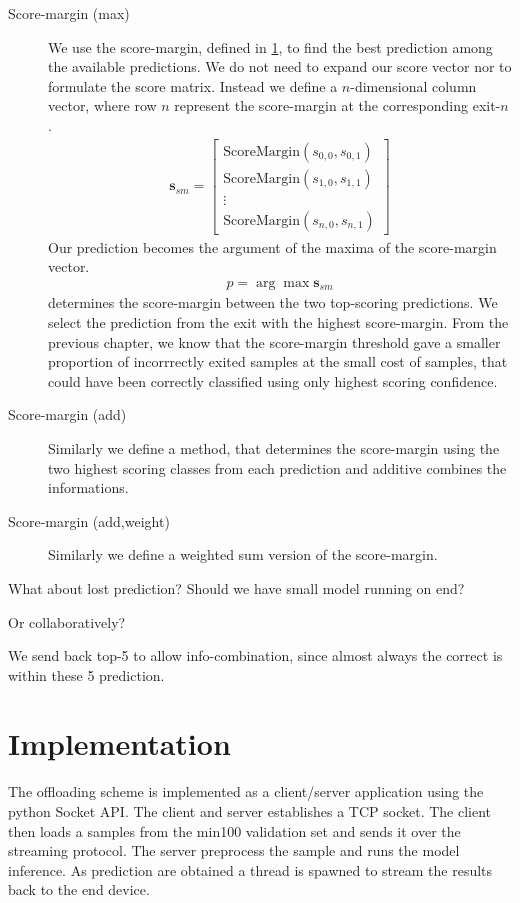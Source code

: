 \begin{description}
	\item[Score-margin (max)] We use the score-margin, defined in \ref{}, to find the best prediction among the available predictions. We do not need to expand our score vector nor to formulate the score matrix. Instead we define a $n$-dimensional column vector, where row $n$ represent the score-margin at the corresponding exit-$n$.  
	\begin{align*}
	\mathbf{s}_{sm} = \begin{bmatrix}
	\mathrm{ScoreMargin}(s_{0,0}, s_{0,1}) \\
	\mathrm{ScoreMargin}(s_{1,0}, s_{1,1}) \\
	\vdots \\
	\mathrm{ScoreMargin}(s_{n,0}, s_{n,1})
	\end{bmatrix}
	\end{align*}
	Our prediction becomes the argument of the maxima of the score-margin vector.
	\begin{align*}
	p = \arg \max \mathbf{s}_{sm}
	\end{align*}
	determines the score-margin between the two top-scoring predictions. We select the prediction from the exit with the highest score-margin. From the previous chapter, we know that the score-margin threshold gave a smaller proportion of incorrrectly exited samples at the small cost of samples, that could have been correctly classified using only highest scoring confidence.	
	\item[Score-margin (add)] Similarly we define a method, that determines the score-margin using the two highest scoring classes from each prediction and additive combines the informations.
	
	\item[Score-margin (add,weight)] Similarly we define a weighted sum version of the score-margin. 
\end{description}


What about lost prediction? Should we have small model running on end?

Or collaboratively?

We send back top-5 to allow info-combination, since almost always the correct is within these 5 prediction. 



\section{Implementation}

The offloading scheme is implemented as a client/server application using the \gls{python} Socket API. The client and server establishes a TCP socket. The client then loads a samples from the \gls{min100} validation set and sends it over the streaming protocol. The server preprocess the sample and runs the model inference. As prediction are obtained a thread is spawned to stream the results back to the end device. 

